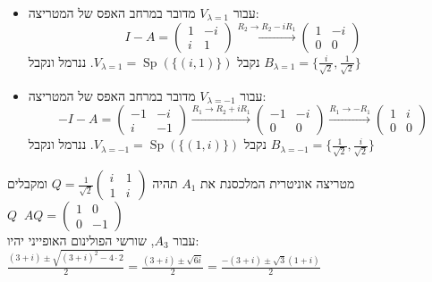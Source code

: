 \documentclass{article}
\DeclareMathOperator{\adj}{^\ast}
\DeclareMathOperator{\Sp}{Sp}
\begin{document}
\begin{itemize}
    \item עבור $V_{\lambda=1}$ מדובר במרחב האפס של המטריצה: \\
          \[
              I-A=\begin{pmatrix}
                  1 & -i \\
                  i & 1
              \end{pmatrix}\xrightarrow{R_2\rightarrow R_2-iR_1}
              \begin{pmatrix}
                  1 & -i \\
                  0 & 0
              \end{pmatrix}
          \]
          נקבל $V_{\lambda=1}=\Sp(\{ (i, 1) \})$.
          ננרמל ונקבל $B_{\lambda=1}=\{ \frac{i}{\sqrt{2}}, \frac{1}{\sqrt{2}} \}$
    \item עבור $V_{\lambda=-1}$ מדובר במרחב האפס של המטריצה: \\
          \[
              -I-A=\begin{pmatrix}
                  -1 & -i \\
                  i  & -1
              \end{pmatrix}\xrightarrow{R_1\rightarrow R_2+iR_1}
              \begin{pmatrix}
                  -1 & -i \\
                  0  & 0
              \end{pmatrix}\xrightarrow{R_1\rightarrow -R_1}
              \begin{pmatrix}
                  1 & i \\
                  0 & 0
              \end{pmatrix}
          \]
          נקבל $V_{\lambda=-1}=\Sp(\{ (1, i) \})$.
          ננרמל ונקבל $B_{\lambda=-1}=\{ \frac{1}{\sqrt{2}}, \frac{i}{\sqrt{2}} \}$
\end{itemize}
מטריצה אוניטרית המלכסנת את $A_1$ תהיה $Q=\frac{1}{\sqrt{2}}\begin{pmatrix}
        i & 1 \\
        1 & i
    \end{pmatrix}$ ומקבלים $Q\adj A Q = \begin{pmatrix}
        1 & 0  \\
        0 & -1
    \end{pmatrix}$ \\
עבור $A_3$, שורשי הפולינום האופייני יהיו: $\frac{(3+i)\pm \sqrt{(3+i)^2-4\cdot 2}}{2}=\frac{(3+i)\pm \sqrt{6i}}{2}=\frac{-(3+i)\pm \sqrt{3}(1+i)}{2}$ \\
\end{document}
